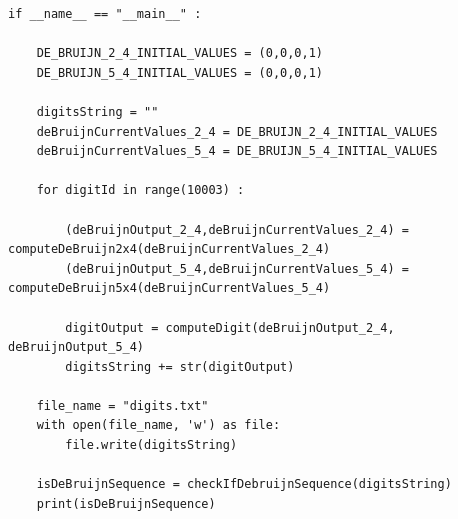 \documentclass{article}
\begin{document}
\begin{verbatim}
if __name__ == "__main__" :
    
    DE_BRUIJN_2_4_INITIAL_VALUES = (0,0,0,1)
    DE_BRUIJN_5_4_INITIAL_VALUES = (0,0,0,1)

    digitsString = ""
    deBruijnCurrentValues_2_4 = DE_BRUIJN_2_4_INITIAL_VALUES
    deBruijnCurrentValues_5_4 = DE_BRUIJN_5_4_INITIAL_VALUES

    for digitId in range(10003) :

        (deBruijnOutput_2_4,deBruijnCurrentValues_2_4) = computeDeBruijn2x4(deBruijnCurrentValues_2_4)
        (deBruijnOutput_5_4,deBruijnCurrentValues_5_4) = computeDeBruijn5x4(deBruijnCurrentValues_5_4)

        digitOutput = computeDigit(deBruijnOutput_2_4, deBruijnOutput_5_4)
        digitsString += str(digitOutput)

    file_name = "digits.txt"
    with open(file_name, 'w') as file:
        file.write(digitsString)

    isDeBruijnSequence = checkIfDebruijnSequence(digitsString)
    print(isDeBruijnSequence)
\end{verbatim}
\end{document}
